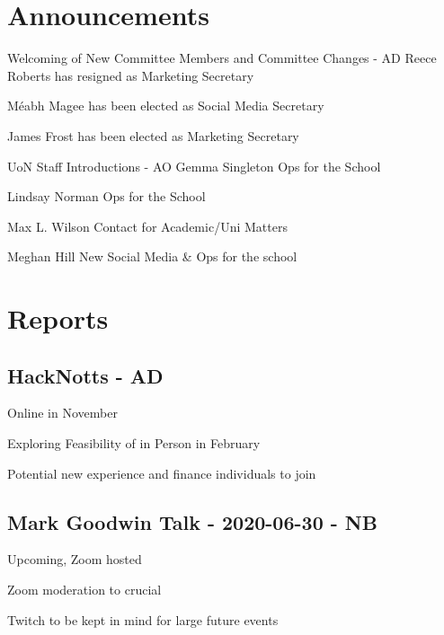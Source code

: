 \documentclass[11pt]{meetingmins}
\begin{document}
\maketitle

\section{Announcements }
\begin{items}
  \item
  Welcoming of New Committee Members and Committee Changes - AD
    \subitem
    Reece Roberts has resigned as Marketing Secretary

    \subitem
    M\'eabh Magee has been elected as Social Media Secretary

    \subitem
    James Frost has been elected as Marketing Secretary

  \item
  UoN Staff Introductions - AO
    \subitem
    Gemma Singleton
      \subsubitem
      Ops for the School

    \subitem
    Lindsay Norman
      \subsubitem
      Ops for the School

    \subitem
    Max L. Wilson
      \subsubitem
      Contact for Academic/Uni Matters

    \subitem
    Meghan Hill 
      \subsubitem
      New Social Media \& Ops for the school
\end{items}

\section{Reports}

\subsection{HackNotts - AD}
\begin{hiddensubitems}
  \item 
  Online in November
  \item 
  Exploring Feasibility of in Person in February
  \item 
  Potential new experience and finance individuals to join
\end{hiddensubitems}

\subsection{Mark Goodwin Talk - 2020-06-30 - NB}
\begin{hiddensubitems}
  \item 
  Upcoming, Zoom hosted
  \item 
  Zoom moderation to crucial
  \item 
  Twitch to be kept in mind for large future events
\end{hiddensubitems}
\end{document}
